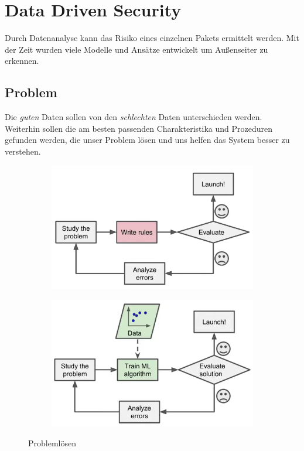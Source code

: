 \section{Data Driven Security}%
\label{sec:data_driven_security}

Durch Datenanalyse kann das Risiko eines einzelnen Pakets ermittelt werden.
Mit der Zeit wurden viele Modelle und Ansätze entwickelt um Außenseiter zu erkennen.

\subsection{Problem}%
\label{sub:problem}

Die \emph{guten} Daten sollen von den \emph{schlechten} Daten unterschieden werden.
Weiterhin sollen die am besten passenden Charakteristika und Prozeduren gefunden werden,
die unser Problem lösen und uns helfen das System besser zu verstehen.

\begin{figure}[h]
  \centering
  \begin{subfigure}[c]{0.45\textwidth}
    \centering
    \includegraphics[width=0.95\linewidth]{bilder/without_ml.png}
    \label{fig:without_ml}
  \end{subfigure}
  \begin{subfigure}[c]{0.45\textwidth}
    \centering
    \includegraphics[width=0.95\linewidth]{bilder/with_ml.png}
    \label{fig:with_ml}
  \end{subfigure}
  \caption{Problemlösen}
\end{figure}

